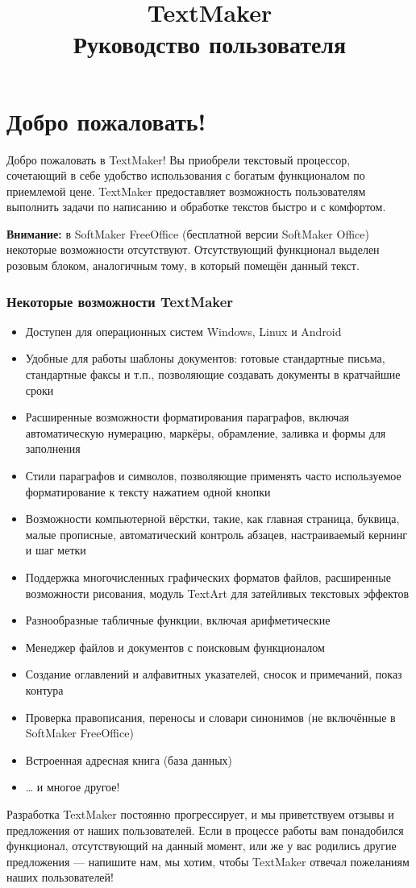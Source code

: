 ﻿\documentclass[a4paper,10pt]{article}
\title{TextMaker\\ Руководство пользователя}
\author{}
\date{}
\begin{document}
\maketitle
\tableofcontents
\section{Добро пожаловать!}

Добро пожаловать в TextMaker! Вы приобрели текстовый процессор, сочетающий в себе удобство использования с богатым функционалом по приемлемой цене. TextMaker предоставляет возможность пользователям выполнить задачи по написанию и обработке текстов быстро и с комфортом. 
\begin{mdframed}[backgroundcolor=pink!50]
\textbf{Внимание:} в SoftMaker FreeOffice (бесплатной версии SoftMaker Office) некоторые возможности отсутствуют. Отсутствующий функционал выделен розовым блоком, аналогичным тому, в который помещён данный текст.
\end{mdframed}
\subsubsection{Некоторые возможности TextMaker}
\begin{itemize}
\item Доступен для операционных систем Windows, Linux и Android
\item Удобные для работы шаблоны документов: готовые стандартные письма, стандартные факсы и т.п., позволяющие создавать документы в кратчайшие сроки
\item Расширенные возможности форматирования параграфов, включая автоматическую нумерацию, маркёры, обрамление, заливка и формы для заполнения
\item Стили параграфов и символов, позволяющие применять часто используемое форматирование к тексту нажатием одной кнопки
\item Возможности компьютерной вёрстки, такие, как главная страница, буквица, малые прописные, автоматический контроль абзацев, настраиваемый кернинг и шаг метки
\item Поддержка многочисленных графических форматов файлов, расширенные возможности рисования, модуль TextArt для затейливых текстовых эффектов
\item Разнообразные табличные функции, включая арифметические
\item Менеджер файлов и документов с поисковым функционалом
\item Создание оглавлений и алфавитных указателей, сносок и примечаний, показ контура
\item Проверка правописания, переносы и словари синонимов (не включённые в SoftMaker FreeOffice)
\item Встроенная адресная книга (база данных)
\item … и многое другое!
\end{itemize}
Разработка TextMaker постоянно прогрессирует, и мы приветствуем отзывы и предложения от наших пользователей. Если в процессе работы вам понадобился функционал, отсутствующий на данный момент, или же у вас родились другие предложения — напишите нам, мы хотим, чтобы TextMaker отвечал пожеланиям наших пользователей!
\end{document}
